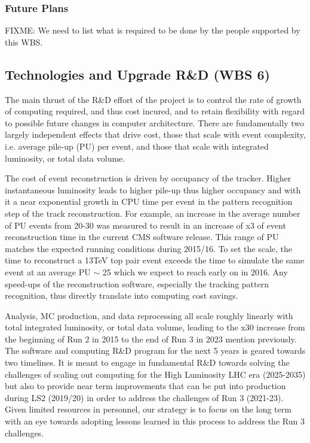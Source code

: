 \documentclass[11pt,a4paper]{article}
\begin{document}
\subsubsection{Future Plans}

{FIXME: We need to list what is required to be done by the people
  supported by this WBS.}

\subsection{Technologies and Upgrade R\&D (WBS 6)}

The main thrust of the R\&D effort of the project is to control the
rate of growth of computing required, and thus cost incured, and to retain
flexibility with regard to possible future changes in computer architecture.  
There are fundamentally two largely independent effects that drive cost,
those that scale with event complexity, i.e. average pile-up (PU) per event, 
and those that scale with integrated luminosity, or total data volume.

The cost of event reconstruction is driven by occupancy of the tracker.
Higher instantaneous luminosity leads to higher pile-up thus higher
occupancy and with it a near exponential growth in CPU time per event 
in the pattern recognition step of the track reconstruction. 
For example, an increase in the average number of PU events from 20-30
was measured to result in an increase of x3 of event reconstruction time in the current CMS software release. 
This range of PU matches the expected running conditions during 2015/16.
To set the scale, the time to reconstruct a 13TeV top pair event exceeds the time to simulate
the same event at an average PU $\sim$ 25 which we expect to reach early on in 2016.
Any speed-ups of the reconstruction software, especially the tracking pattern recognition, 
thus directly translate into computing cost savings.

Analysis, MC production, and data reprocessing all scale roughly linearly with total integrated luminosity, or total
data volume, leading to the x30 increase from the beginning of Run 2 in 2015 to the end of Run 3 in 2023 mention previously. 
The software and computing R\&D program for the next 5 years is geared towards two timelines. It is meant to
engage in fundamental R\&D towards solving the challenges of scaling out computing for the High Luminosity LHC era
(2025-2035) but also to provide near term improvements that can be put into production during LS2 (2019/20)
in order to address the challenges of Run 3 (2021-23). Given limited resources in personnel, our strategy is to focus
on the long term with an eye towards adopting lessons learned in this process to address the Run 3 challenges.
\end{document}
